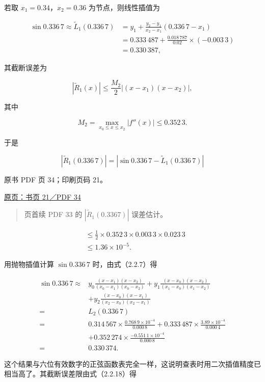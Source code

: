 若取 \(x_1=0.34\)，\(x_2=0.36\) 为节点，则线性插值为

\[
\begin{aligned}
\sin0.336\,7\approx\widetilde L_1(0.336\,7)
&=y_1+\frac{y_2-y_1}{x_2-x_1}(0.336\,7-x_1)\\
&=0.333\,487+\frac{0.018\,787}{0.02}\times(-0.003\,3)\\
&=0.330\,387,
\end{aligned}
\]

其截断误差为

\[
|\widetilde R_1(x)|\le\frac{M_2}{2}|(x-x_1)(x-x_2)|,
\]

其中

\[
M_2=\max_{x_0\le x\le x_2}|f''(x)|\le0.352\,3.
\]

于是

\[
|\widetilde R_1(0.336\,7)|=|\sin0.336\,7-\widetilde L_1(0.336\,7)|
\]

\clearpage

原书 PDF 页 34；印刷页码 21。

\href{source-images/pdf-034.jpeg}{原页：书页 21／PDF 34}

\begin{quote}
页首续 PDF 33 的 \(|\widetilde R_1(0.3367)|\) 误差估计。
\end{quote}

\[
\begin{aligned}
&\le\frac12\times0.352\,3\times0.003\,3\times0.023\,3\\
&\le1.36\times10^{-5}.
\end{aligned}
\]

用抛物插值计算 \(\sin0.336\,7\) 时，由式（2.2.7）得

\[
\begin{aligned}
\sin0.336\,7\approx{}&
y_0\frac{(x-x_1)(x-x_2)}{(x_0-x_1)(x_0-x_2)}
+y_1\frac{(x-x_0)(x-x_2)}{(x_1-x_0)(x_1-x_2)}\\
&+y_2\frac{(x-x_0)(x-x_1)}{(x_2-x_0)(x_2-x_1)}\\
={}&L_2(0.336\,7)\\
={}&0.314\,567\times\frac{0.768\,9\times10^{-4}}{0.000\,8}
+0.333\,487\times\frac{3.89\times10^{-4}}{0.000\,4}\\
&+0.352\,274\times\frac{-0.551\,1\times10^{-4}}{0.000\,8}\\
={}&0.330\,374.
\end{aligned}
\]

这个结果与六位有效数字的正弦函数表完全一样，这说明查表时用二次插值精度已相当高了。其截断误差限由式（2.2.18）得


